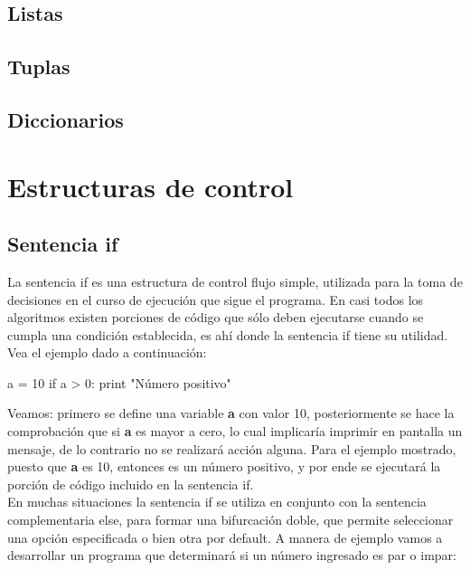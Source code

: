 \subsection{Listas}


\subsection{Tuplas}


\subsection{Diccionarios}



\section{Estructuras de control}

\subsection{Sentencia if}

La sentencia if es una estructura de control flujo simple, utilizada para la toma 
de decisiones en el curso de ejecución que sigue el programa. En casi todos los algoritmos 
existen porciones de código que sólo deben ejecutarse cuando se cumpla una condición 
establecida, es ahí donde la sentencia if tiene su utilidad. Vea el ejemplo dado 
a continuación:

\begin{python}
a = 10
	if a > 0:
	    print "Número positivo"
\end{python}

Veamos: primero se define una variable {\bf a} con valor 10, posteriormente se hace la 
comprobación que si {\bf a} es mayor a cero, lo cual implicaría imprimir en pantalla 
un mensaje, de lo contrario no se realizará acción alguna. Para el ejemplo mostrado, 
puesto que {\bf a} es 10, entonces es un número positivo, y por ende se ejecutará la 
porción de código incluido en la sentencia if.\\

En muchas situaciones la sentencia if se utiliza en conjunto con la sentencia 
complementaria else, para formar una bifurcación doble, que permite seleccionar 
una opción especificada o bien otra por default. A manera de ejemplo vamos a desarrollar 
un programa que determinará si un número ingresado es par o impar:


